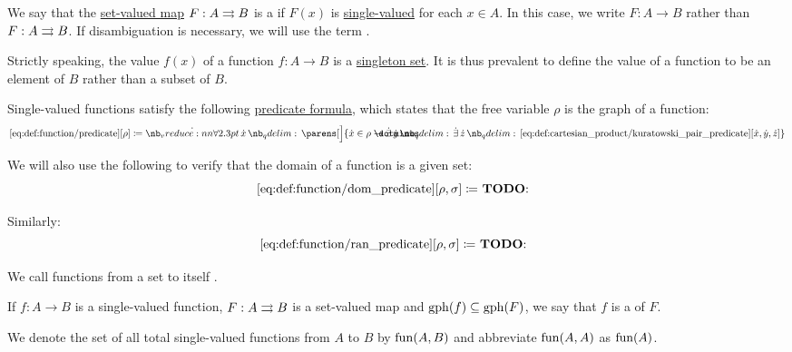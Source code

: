 \begin{definition}\label{def:function}
  We say that the \hyperref[def:function]{set-valued map} \( F: A \rightrightarrows B \) is a  if \( F(x) \) is \hyperref[def:set_valued_map/value]{single-valued} for each \( x \in A \). In this case, we write \( F: A \to B \) rather than \( F: A \rightrightarrows B \). If disambiguation is necessary, we will use the term .

  Strictly speaking, the value \( f(x) \) of a function \( f: A \to B \) is a \hyperref[rem:singleton_sets]{singleton set}. It is thus prevalent to define the value of a function to be an element of \( B \) rather than a subset of \( B \).

  Single-valued functions satisfy the following \hyperref[con:predicate_formula]{predicate formula}, which states that the free variable \( \rho \) is the graph of a function:
  \begin{equation*}\taglabel[\op{IsFun}]{eq:def:function/predicate}
    \ref{eq:def:function/predicate}[\rho] \coloneqq \qforall \synx \parens[\Big]{ \synx \in \rho \synimplies \qexists \syny \qexists \synz \ref{eq:def:cartesian_product/kuratowski_pair_predicate}[\synx, \syny, \synz] }
  \end{equation*}

  We will also use the following to verify that the domain of a function is a given set:
  \begin{equation*}\taglabel[\op{IsDom}]{eq:def:function/dom_predicate}
    \ref{eq:def:function/dom_predicate}[\rho, \sigma] \coloneqq \T{\todo{}}
  \end{equation*}

  Similarly:
  \begin{equation*}\taglabel[\op{IsRan}]{eq:def:function/ran_predicate}
    \ref{eq:def:function/ran_predicate}[\rho, \sigma] \coloneqq \T{\todo{}}
  \end{equation*}

  \begin{thmenum}
     We call functions from a set to itself .

    \medskip

     If \( f: A \to B \) is a single-valued function, \( F: A \rightrightarrows B \) is a set-valued map and \( \operatorname{gph}(f) \subseteq \operatorname{gph}(F) \), we say that \( f \) is a  of \( F \).

    \mimprovised We denote the set of all total single-valued functions from \( A \) to \( B \) by \( \operatorname{fun}(A, B) \) and abbreviate \( \operatorname{fun}(A, A) \) as \( \operatorname{fun}(A) \).
  \end{thmenum}
\end{definition}
